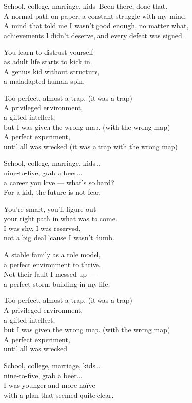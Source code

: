 \begin{lyrics}
School, college, marriage, kids. Been there, done that.\\
A normal path on paper, a constant struggle with my mind.\\
A mind that told me I wasn't good enough, no matter what,\\
achievements I didn't deserve, and every defeat was signed.

You learn to distrust yourself\\
as adult life starts to kick in.\\
A genius kid without structure,\\
a maladapted human spin.

Too perfect, almost a trap. (it was a trap)\\
A privileged environment,\\
a gifted intellect,\\
but I was given the wrong map. (with the wrong map)\\
A perfect experiment,\\
until all was wrecked
(it was a trap with the wrong map)

School, college, marriage, kids...\\
nine-to-five, grab a beer...\\
a career you love — what's so hard?\\
For a kid, the future is not fear.

You're smart, you'll figure out\\
your right path in what was to come.\\
I was shy, I was reserved,\\
not a big deal 'cause I wasn't dumb.

A stable family as a role model,\\
a perfect environment to thrive.\\
Not their fault I messed up —\\
a perfect storm building in my life.

Too perfect, almost a trap. (it was a trap)\\
A privileged environment,\\
a gifted intellect,\\
but I was given the wrong map. (with the wrong map)\\
A perfect experiment,\\
until all was wrecked

School, college, marriage, kids...\\
nine-to-five, grab a beer...\\
I was younger and more naïve\\
with a plan that seemed quite clear.
\end{lyrics}

